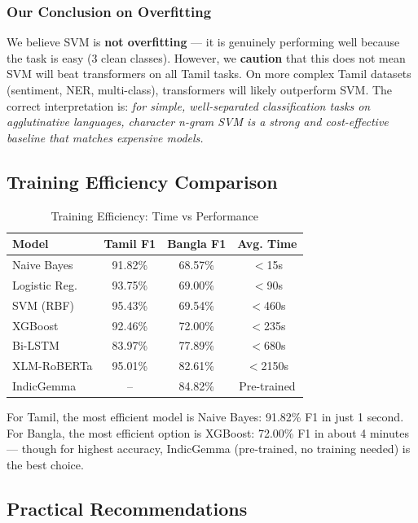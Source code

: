 \documentclass[conference]{IEEEtran}
\begin{document}
\subsubsection{Our Conclusion on Overfitting}
We believe SVM is \textbf{not overfitting} --- it is genuinely performing well because the task is easy (3 clean classes). However, we \textbf{caution} that this does not mean SVM will beat transformers on all Tamil tasks. On more complex Tamil datasets (sentiment, NER, multi-class), transformers will likely outperform SVM. The correct interpretation is: \textit{for simple, well-separated classification tasks on agglutinative languages, character n-gram SVM is a strong and cost-effective baseline that matches expensive models.}

\subsection{Training Efficiency Comparison}

\begin{table}[h]
\centering
\caption{Training Efficiency: Time vs Performance}
\label{tab:efficiency}
\begin{tabular}{lccc}
\toprule
\textbf{Model} & \textbf{Tamil F1} & \textbf{Bangla F1} & \textbf{Avg. Time} \\
\midrule
Naive Bayes & 91.82\% & 68.57\% & $<$15s \\
Logistic Reg. & 93.75\% & 69.00\% & $<$90s \\
SVM (RBF) & 95.43\% & 69.54\% & $<$460s \\
XGBoost & 92.46\% & 72.00\% & $<$235s \\
Bi-LSTM & 83.97\% & 77.89\% & $<$680s \\
XLM-RoBERTa & 95.01\% & 82.61\% & $<$2150s \\
IndicGemma & -- & 84.82\% & Pre-trained \\
\bottomrule
\end{tabular}
\end{table}

For Tamil, the most efficient model is Naive Bayes: 91.82\% F1 in just 1 second. For Bangla, the most efficient option is XGBoost: 72.00\% F1 in about 4 minutes --- though for highest accuracy, IndicGemma (pre-trained, no training needed) is the best choice.

\subsection{Practical Recommendations}
\end{document}
